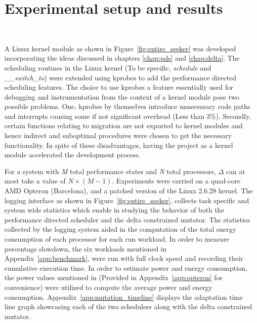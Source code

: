 \chapter{Experimental setup and results}~\label{chap:results}

A Linux kernel module as shown in Figure~\ref{fig:entire_seeker} was developed incorporating the ideas 
discussed in chapters \ref{chap:pds} and \ref{chap:delta}. 
The scheduling routines in the Linux kernel (To be specific, \textit{schedule} and \textit{\_\_switch\_to})
were extended using kprobes \cite{kprobes} to add the performance directed scheduling features.
The choice to use kprobes \cite{kprobes} a feature essentially used for debugging and instrumentation
from the context of a kernel module pose two possible 
problems. One, kprobes by themselves introduce unnecessary code paths and interrupts causing some
if not significant overhead (Less than 3\%). Secondly, certain functions relating to migration are not exported
to kernel modules and hence indirect and suboptimal procedures were chosen to get the necessary 
functionality. In spite of these disadvantages, having the project as a kernel module accelerated 
the development process. 

For a system with \textit{M} total performance states and \textit{N} total processors, $\Delta$ can 
at most take a value of $N \times (M-1)$. Experiments were carried on a quad-core AMD Opteron (Barcelona),
and a patched version of the Linux 2.6.28 kernel. The logging interface as shown in Figure~\ref{fig:entire_seeker},
collects task specific and system wide statistics which enable in studying the behavior of both the performance
directed scheduler and the delta constrained mutator. The statistics collected by the logging system aided in 
the computation of the total energy consumption of each processor for each run workload. In order to measure 
percentage slowdown, the six workloads mentioned in Appendix~\ref{app:benchmark}, were run with full clock speed
and recording their cumulative execution time. In order to estimate power and energy consumption, the power 
values mentioned in \cite{AMDPow} (Provided in Appendix~\ref{app:opteron} for convenience) were utilized 
to compute the average power and energy consumption. Appendix~\ref{app:mutation_timeline} displays the 
adaptation time line graph showcasing each of the two schedulers along with the delta constrained mutator.


